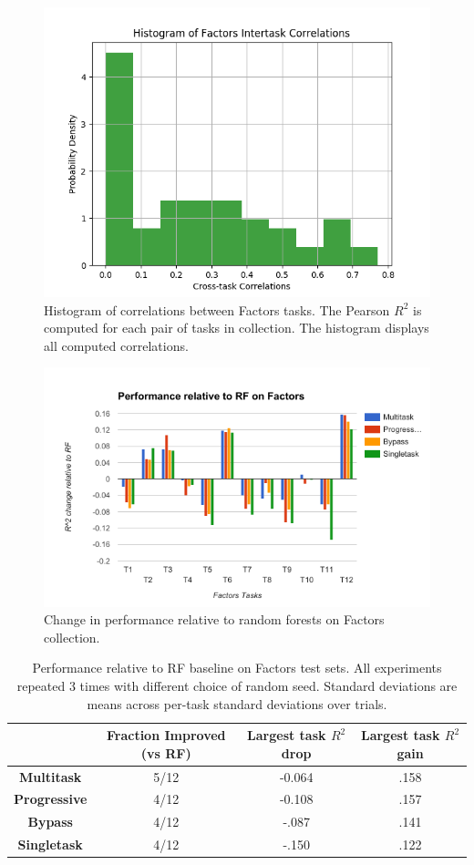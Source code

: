 \begin{figure}[H]
  \includegraphics[width=.75\textwidth]{Images/Factors_correlations.png}
  \caption{Histogram of correlations between Factors tasks. The Pearson $R^2$ is computed for each pair of tasks in collection. The histogram displays all computed correlations.}
  \label{fig:factors-corrs}
\end{figure}

\begin{figure}[H]
  \includegraphics[width=.9\textwidth]{Images/Factors_imp.png}
  \caption{Change in performance relative to random forests on Factors collection. }
  \label{fig:factors-imp}
\end{figure}


\begin{table}[h]
    \centering
    \begin{tabular}{ |c|c|c|c| } 
    \hline
     & Fraction Improved (vs RF) & Largest task $R^2$ drop & Largest task $R^2$ gain \\ 
    \hline
    \textbf{Multitask} & 5/12 & -0.064 & .158  \\
    \hline
    \textbf{Progressive} & 4/12 & -0.108 & .157  \\
    \hline
    \textbf{Bypass} & 4/12 & -.087 & .141 \\
    \hline
    \textbf{Singletask} & 4/12 & -.150 &  .122 \\
    \hline
    \end{tabular}
    \caption{Performance relative to RF baseline on Factors test sets. All experiments repeated 3 times with different choice of random seed. Standard deviations are means across per-task standard deviations over trials.}
    \label{tab:factors-comp}
\end{table}

